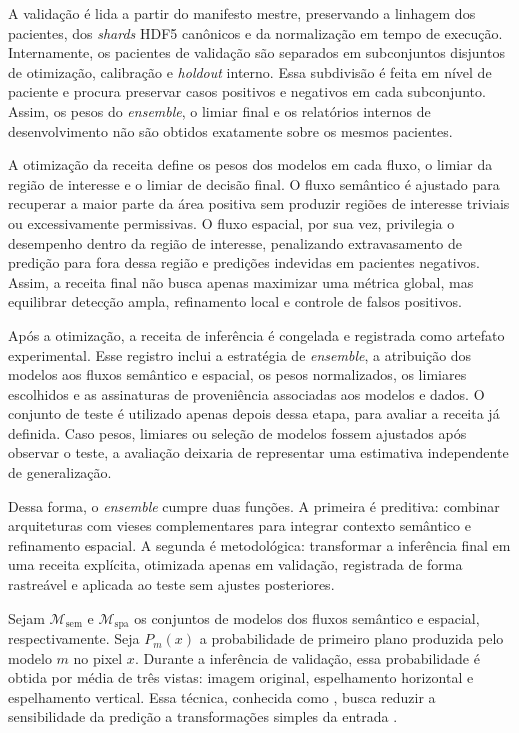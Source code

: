 A validação é lida a partir do manifesto mestre, preservando a linhagem dos
pacientes, dos \textit{shards} HDF5 canônicos e da normalização em tempo de execução.
Internamente, os pacientes de validação são separados em subconjuntos disjuntos
de otimização, calibração e \textit{holdout} interno. Essa
subdivisão é feita em nível de paciente e procura preservar casos positivos e
negativos em cada subconjunto. Assim, os pesos do \textit{ensemble}, o limiar
final e os relatórios internos de desenvolvimento não são obtidos exatamente
sobre os mesmos pacientes.

A otimização da receita define os pesos dos modelos em cada fluxo, o limiar da
região de interesse e o limiar de decisão final. O fluxo semântico é ajustado
para recuperar a maior parte da área positiva sem produzir regiões de interesse
triviais ou excessivamente permissivas. O fluxo espacial, por sua vez, privilegia
o desempenho dentro da região de interesse, penalizando extravasamento de
predição para fora dessa região e predições indevidas em pacientes negativos.
Assim, a receita final não busca apenas maximizar uma métrica global, mas
equilibrar detecção ampla, refinamento local e controle de falsos positivos.

Após a otimização, a receita de inferência é congelada e registrada como
artefato experimental. Esse registro inclui a estratégia de \textit{ensemble}, a
atribuição dos modelos aos fluxos semântico e espacial, os pesos normalizados,
os limiares escolhidos e as assinaturas de proveniência associadas aos modelos e
dados. O conjunto de teste é utilizado apenas depois dessa etapa, para avaliar a
receita já definida. Caso pesos, limiares ou seleção de modelos fossem ajustados
após observar o teste, a avaliação deixaria de representar uma estimativa
independente de generalização.

Dessa forma, o \textit{ensemble} cumpre duas funções. A primeira é preditiva:
combinar arquiteturas com vieses complementares para integrar contexto semântico
e refinamento espacial. A segunda é metodológica: transformar a inferência final
em uma receita explícita, otimizada apenas em validação, registrada de forma
rastreável e aplicada ao teste sem ajustes posteriores.

Sejam $\mathcal{M}_{\mathrm{sem}}$ e $\mathcal{M}_{\mathrm{spa}}$ os conjuntos de
modelos dos fluxos semântico e espacial, respectivamente. Seja $P_m(x)$ a
probabilidade de primeiro plano produzida pelo modelo $m$ no pixel $x$. Durante
a inferência de validação, essa probabilidade é obtida por média de três vistas:
imagem original, espelhamento horizontal e espelhamento vertical. Essa técnica, conhecida como , busca reduzir a sensibilidade da predição a
transformações simples da entrada \cite{moshkov2020test}. 

